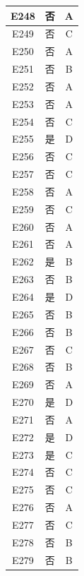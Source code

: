 \documentclass[UTF8]{ctexart}
\begin{document}
\begin{center}
\begin{longtable}{|c|c|c|}
		E248     & 否       & A        \\ \hline
		E249     & 否       & C        \\ \hline
		E250     & 否       & A        \\ \hline
		E251     & 否       & B        \\ \hline
		E252     & 否       & A        \\ \hline
		E253     & 否       & A        \\ \hline
		E254     & 否       & C        \\ \hline
		E255     & 是       & D        \\ \hline
		E256     & 否       & C        \\ \hline
		E257     & 否       & C        \\ \hline
		E258     & 否       & A        \\ \hline
		E259     & 否       & C        \\ \hline
		E260     & 否       & A        \\ \hline
		E261     & 否       & A        \\ \hline
		E262     & 是       & B        \\ \hline
		E263     & 否       & B        \\ \hline
		E264     & 是       & D        \\ \hline
		E265     & 否       & B        \\ \hline
		E266     & 否       & B        \\ \hline
		E267     & 否       & C        \\ \hline
		E268     & 否       & B        \\ \hline
		E269     & 否       & A        \\ \hline
		E270     & 是       & D        \\ \hline
		E271     & 否       & A        \\ \hline
		E272     & 是       & D        \\ \hline
		E273     & 是       & C        \\ \hline
		E274     & 否       & C        \\ \hline
		E275     & 否       & C        \\ \hline
		E276     & 否       & A        \\ \hline
		E277     & 否       & C        \\ \hline
		E278     & 否       & B        \\ \hline
		E279     & 否       & B        \\ \hline

\end{longtable}
\end{center}
\end{document}

